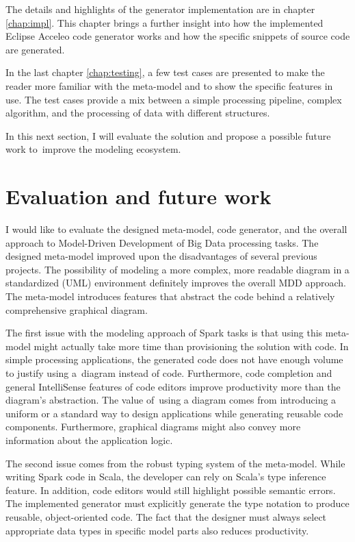 The details and highlights of the generator implementation are in chapter \ref{chap:impl}. This chapter brings a further insight into how the implemented Eclipse Acceleo code generator works and how the specific snippets of source code are generated. 

In the last chapter \ref{chap:testing}, a few test cases are presented to make the reader more familiar with the meta-model and to show the specific features in use. The test cases provide a mix between a simple processing pipeline, complex algorithm, and the processing of data with different structures.

In this next section, I will evaluate the solution and propose a possible future work to~improve the modeling ecosystem.

\section{Evaluation and future work}

I would like to evaluate the designed meta-model, code generator, and the overall approach to Model-Driven Development of Big Data processing tasks. The designed meta-model improved upon the disadvantages of several previous projects. The possibility of modeling a more complex, more readable diagram in a standardized (UML) environment definitely improves the overall MDD approach. The meta-model introduces features that abstract the code behind a relatively comprehensive graphical diagram. 

The first issue with the modeling approach of Spark tasks is that using this meta-model might actually take more time than provisioning the solution with code. In simple processing applications, the generated code does not have enough volume to justify using a~diagram instead of code. Furthermore, code completion and general IntelliSense features of code editors improve productivity more than the diagram's abstraction. The value of~using a diagram comes from introducing a uniform or a standard way to design applications while generating reusable code components. Furthermore, graphical diagrams might also convey more information about the application logic. 

The second issue comes from the robust typing system of the meta-model. While writing Spark code in Scala, the developer can rely on Scala's type inference feature. In addition, code editors would still highlight possible semantic errors. The implemented generator must explicitly generate the type notation to produce reusable, object-oriented code. The fact that the designer must always select appropriate data types in specific model parts also reduces productivity.

